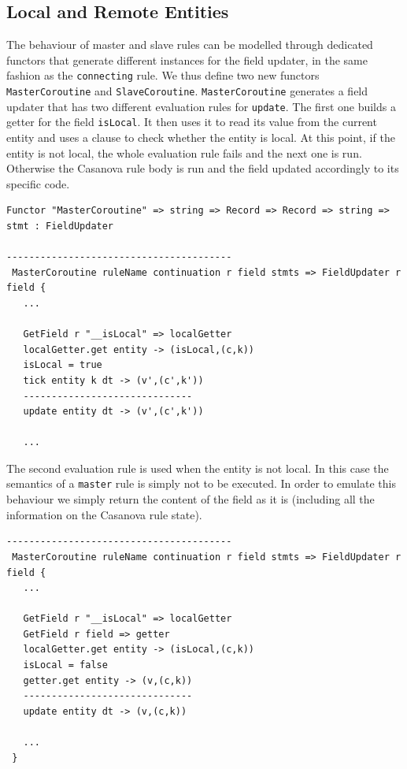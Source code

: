\subsection{Local and Remote Entities}
\label{subsec:ch_networking_local_and_remote}
The behaviour of master and slave rules can be modelled through dedicated functors that generate different instances for the field updater, in the same fashion as the \texttt{connecting} rule. We thus define two new functors \texttt{MasterCoroutine} and \texttt{SlaveCoroutine}. \texttt{MasterCoroutine} generates a field updater that has two different evaluation rules for \texttt{update}. The first one builds a getter for the field \texttt{\tu\tu isLocal}. It then uses it to read its value from the current entity and uses a clause to check whether the entity is local. At this point, if the entity is not local, the whole evaluation rule fails and the next one is run. Otherwise the Casanova rule body is run and the field updated accordingly to its specific code.

\begin{lstlisting}
Functor "MasterCoroutine" => string => Record => Record => string => stmt : FieldUpdater

----------------------------------------
 MasterCoroutine ruleName continuation r field stmts => FieldUpdater r field {
   ...
   
   GetField r "__isLocal" => localGetter
   localGetter.get entity -> (isLocal,(c,k))
   isLocal = true
   tick entity k dt -> (v',(c',k'))
   ------------------------------
   update entity dt -> (v',(c',k'))
   
   ...
\end{lstlisting}

\noindent
The second evaluation rule is used when the entity is not local. In this case the semantics of a \texttt{master} rule is simply not to be executed. In order to emulate this behaviour we simply return the content of the field as it is (including all the information on the Casanova rule state).
\begin{lstlisting}
----------------------------------------
 MasterCoroutine ruleName continuation r field stmts => FieldUpdater r field {
   ...
   
   GetField r "__isLocal" => localGetter
   GetField r field => getter
   localGetter.get entity -> (isLocal,(c,k))
   isLocal = false
   getter.get entity -> (v,(c,k))
   ------------------------------
   update entity dt -> (v,(c,k))
   
   ...
 }
\end{lstlisting}

